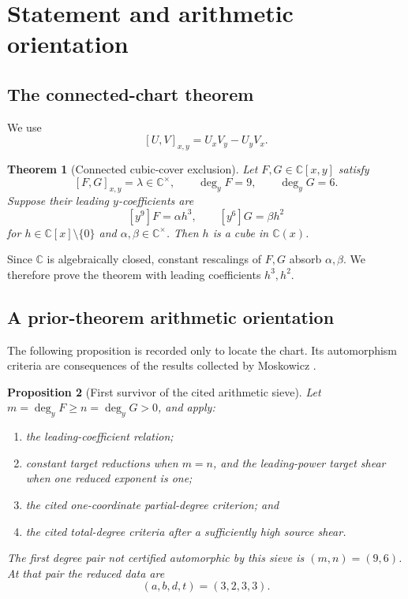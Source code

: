 \documentclass[11pt]{article}
\newtheorem{theorem}{Theorem}[section]
\newtheorem{proposition}[theorem]{Proposition}
\theoremstyle{definition}
\theoremstyle{remark}
\newcommand{\C}{\mathbb C}
\begin{document}
\section{Statement and arithmetic orientation}

\subsection{The connected-chart theorem}

We use
\[
 [U,V]_{x,y}=U_xV_y-U_yV_x .
\]

\begin{theorem}[Connected cubic-cover exclusion]
\label{thm:main}
Let \(F,G\in\C[x,y]\) satisfy
\[
 [F,G]_{x,y}=\lambda\in\C^\times,\qquad
 \deg_yF=9,\qquad \deg_yG=6.
\]
Suppose their leading \(y\)-coefficients are
\[
 [y^9]F=\alpha h^3,\qquad [y^6]G=\beta h^2
\]
for \(h\in\C[x]\setminus\{0\}\) and
\(\alpha,\beta\in\C^\times\).  Then \(h\) is a cube in \(\C(x)\).
\end{theorem}

Since \(\C\) is algebraically closed, constant rescalings of \(F,G\)
absorb \(\alpha,\beta\).  We therefore prove the theorem with leading
coefficients \(h^3,h^2\).

\subsection{A prior-theorem arithmetic orientation}
\label{sec:arithmetic}

The following proposition is recorded only to locate the chart.  Its
automorphism criteria are consequences of the results collected by
Moskowicz \cite[Theorems 1.1, 1.2, 2.6, and 2.7]{Moskowicz}.

\begin{proposition}[First survivor of the cited arithmetic sieve]
\label{prop:orientation}
Let \(m=\deg_yF\geq n=\deg_yG>0\), and apply:
\begin{enumerate}[label=\textup{(\roman*)}]
 \item the leading-coefficient relation;
 \item constant target reductions when \(m=n\), and the leading-power
 target shear when one reduced exponent is one;
 \item the cited one-coordinate partial-degree criterion; and
 \item the cited total-degree criteria after a sufficiently high source
 shear.
\end{enumerate}
The first degree pair not certified automorphic by this sieve is
\((m,n)=(9,6)\).  At that pair the reduced data are
\[
 (a,b,d,t)=(3,2,3,3).
\]
\end{proposition}
\end{document}
